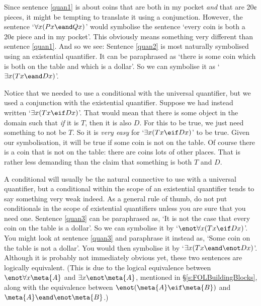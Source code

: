 Since sentence \ref{quan1} is about coins that are both in my pocket \emph{and} that are 20¢ pieces, it might be tempting to translate it using a conjunction. However, the sentence `$\forall x(Px \eand Qx)$' would symbolise the sentence `every coin is both a 20¢ piece and in my pocket'. This obviously means something very different than sentence \ref{quan1}. And so we see:
Sentence \ref{quan2} is most naturally symbolised using an existential quantifier. It can be paraphrased as `there is some coin which is both on the table and which is a dollar'. So we can symbolise it as `$\exists x(Tx \eand Dx)$'.

Notice that we needed to use a conditional with the universal quantifier, but we used a conjunction with the existential quantifier. Suppose we had instead written `$\exists x(Tx \eif Dx)$'. That would mean that there is some object in the domain such that  \emph{if} it is $T$, then it is also $D$. For this to be true, we just need something to not be $T$. So it is \emph{very easy} for `$\exists x(Tx \eif Dx)$' to be true. Given our symbolisation, it will be true if some coin is not on the table. Of course there is a coin that is not on the table: there are coins lots of other places.  That is rather less demanding than the claim that something is both $T$ and $D$.


A conditional will usually be the natural connective to use with a universal quantifier, but a conditional within the scope of an existential quantifier tends to say something very weak indeed. As a general rule of thumb, do not put conditionals in the scope of existential quantifiers unless you are sure that you need one.
Sentence \ref{quan3} can be paraphrased as, `It is not the case that every coin on the table is a dollar'. So we can symbolise it by `$\enot \forall x(Tx \eif Dx)$'. You might look at sentence \ref{quan3} and paraphrase it instead as, `Some coin on the table is not a dollar'. You would then symbolise it by `$\exists x(Tx \eand \enot Dx)$'. Although it is probably not immediately obvious yet, these two sentences are logically equivalent. (This is due to the logical equivalence between $\enot\forall x\meta{A}$ and $\exists x\enot\meta{A}$, mentioned in §\ref{s:FOLBuildingBlocks}, along with the equivalence between $\enot(\meta{A}\eif\meta{B})$ and $\meta{A}\eand\enot\meta{B}$.)

